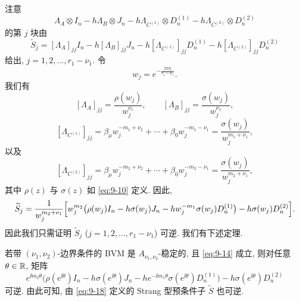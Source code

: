 注意
\[
  \Lambda_A\otimes I_n-h\Lambda_B\otimes J_n
  -h\Lambda_{C^{(1)}}\otimes D_n^{(1)}-h\Lambda_{C^{(2)}}\otimes D_n^{(2)}
\]
的第 $j$ 块由
\[
  \widetilde{S}_j=[\Lambda_A]_{jj}I_n-h[\Lambda_B]_{jj}J_n
  -h[\Lambda_{C^{(1)}}]_{jj}D_n^{(1)}-h[\Lambda_{C^{(2)}}]_{jj}D_n^{(2)}
\]
给出, $j=1,2,\ldots,r_1-\nu_1$. 令
\[
  w_j=e^{-\frac{2\pi\ii j}{r_1-\nu_1}}.
\]
我们有
\[
  [\Lambda_A]_{jj}=\frac{\rho(w_j)}{w_j^{\nu_1}},\qquad
  [\Lambda_B]_{jj}=\frac{\sigma(w_j)}{w_j^{\nu_1}},
\]
\[
  [\Lambda_{C^{(1)}}]_{jj}
  =\beta_{\mu}w_j^{-m_1+\nu_2}+\cdots+\beta_0w_j^{-m_1-\nu_1}
  =\frac{\sigma(w_j)}{w_j^{m_1+\nu_1}},
\]
以及
\[
  [\Lambda_{C^{(2)}}]_{jj}
  =\beta_{\mu}w_j^{-m_2+\nu_2}+\cdots+\beta_0w_j^{-m_2-\nu_1}
  =\frac{\sigma(w_j)}{w_j^{m_2+\nu_1}},
\]
其中 $\rho(z)$ 与 $\sigma(z)$ 如 \eqref{eq:9-10} 定义. 因此,
\[
  \widetilde{S}_j=\frac{1}{w_j^{m_2+\nu_1}}
  \Bigl[w_j^{m_2}\bigl(\rho(w_j)I_n-h\sigma(w_j)J_n
  -hw_j^{-m_1}\sigma(w_j)D_n^{(1)}\bigr)
  -h\sigma(w_j)D_n^{(2)}\Bigr].
\]
因此我们只需证明 $\widetilde{S}_j$ ($j=1,2,\ldots,r_1-\nu_1$) 可逆. 我们有下述定理.

\begin{theorem}
\label{thm:9-3}
若带 $(\nu_1,\nu_2)$-边界条件的 BVM 是 $A_{\nu_1,\nu_2}$-稳定的, 且 \eqref{eq:9-14} 成立, 则对任意 $\theta\in\mathbb{R}$, 矩阵
\[
  e^{\ii m_2\theta}\bigl(\rho(e^{\ii\theta})I_n-h\sigma(e^{\ii\theta})J_n
  -he^{-\ii m_1\theta}\sigma(e^{\ii\theta})D_n^{(1)}\bigr)
  -h\sigma(e^{\ii\theta})D_n^{(2)}
\]
可逆. 由此可知, 由 \eqref{eq:9-18} 定义的 Strang 型预条件子 $\widetilde{S}$ 也可逆.
\end{theorem}


